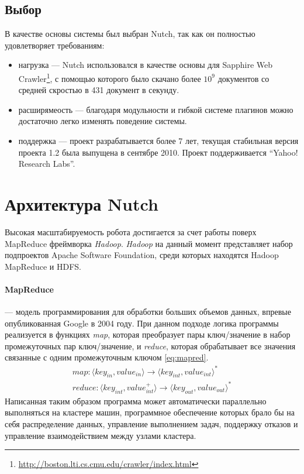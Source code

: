\subsection{Выбор}
В качестве основы системы был выбран Nutch, так как он полностью удовлетворяет требованиям:
\begin{itemize}
 \item нагрузка --- Nutch использовался в качестве основы для Sapphire Web Crawler\footnote{\href{http://boston.lti.cs.cmu.edu/crawler/index.html}{http://boston.lti.cs.cmu.edu/crawler/index.html}}, с помощью которого было скачано более $10^{9}$ документов со средней скростью в 431 документ в секунду.
 \item расширямеость --- благодаря модульности и гибкой системе плагинов можно достаточно легко изменять поведение системы.
 \item поддержка --- проект разрабатывается более 7 лет, текущая стабильная версия проекта 1.2 была выпущена в сентябре 2010. Проект поддерживается ``Yahoo! Research Labs''.
\end{itemize}

\section{Архитектура Nutch}
Высокая масштабируемость робота достигается за счет работы поверх MapReduce фреймворка \textit{Hadoop}\cite{hadoopdefguide}. \textit{Hadoop} на данный момент представляет набор подпроектов Apache Software Foundation, среди которых находятся Hadoop MapReduce и HDFS. 
\paragraph{MapReduce} --- модель программирования для обработки больших объемов данных, впревые опубликованная\cite{googlemr} Google в 2004 году. При данном подходе логика программы реализуется в функциях \textit{map}, которая преобразует пары ключ/значение в набор промежуточных пар ключ/значение, и \textit{reduce}, которая обрабатывает все значения связанные с одним промежуточным ключом \ref{eq:mapred}.
\begin{equation}\label{eq:mapred}
\begin{split}
map:\langle key_{in}, value_{in}\rangle\rightarrow\langle key_{int}, value_{int}\rangle^{*} \\
reduce:\langle key_{int}, value_{int}^{+}\rangle\rightarrow\langle key_{out}, value_{out}\rangle^{*}
\end{split}
\end{equation}
Написанная таким образом программа может автоматически параллельно выполняться на кластере машин, программное обеспечение которых брало бы на себя распределение данных, управление выполнением задач, поддержку отказов и управление взаимодействием между узлами кластера. 
